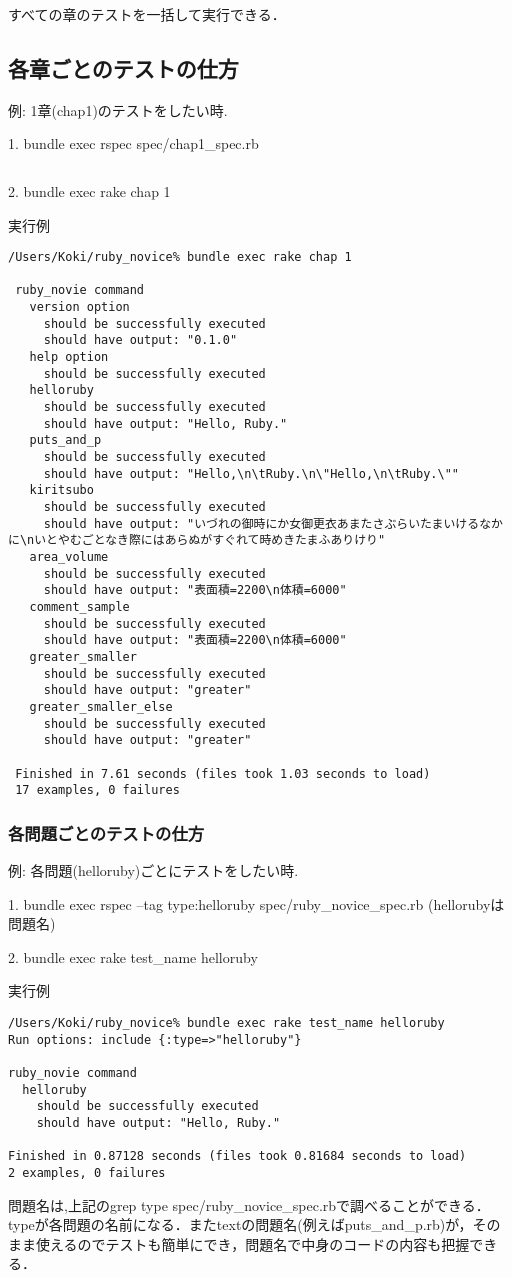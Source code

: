 すべての章のテストを一括して実行できる．

\subsection{各章ごとのテストの仕方}
例: 1章(chap1)のテストをしたい時.

1. bundle exec rspec spec/chap1\_spec.rb
\begin{quote}\begin{verbatim}

\end{verbatim}\end{quote}
2. bundle exec rake chap 1

実行例
\begin{lstlisting}[style=customRuby,basicstyle={\scriptsize\ttfamily}]
 /Users/Koki/ruby_novice% bundle exec rake chap 1   
 
 ruby_novie command
   version option
     should be successfully executed
     should have output: "0.1.0"
   help option
     should be successfully executed
   helloruby
     should be successfully executed
     should have output: "Hello, Ruby."
   puts_and_p
     should be successfully executed
     should have output: "Hello,\n\tRuby.\n\"Hello,\n\tRuby.\""
   kiritsubo
     should be successfully executed
     should have output: "いづれの御時にか女御更衣あまたさぶらいたまいけるなかに\nいとやむごとなき際にはあらぬがすぐれて時めきたまふありけり"
   area_volume
     should be successfully executed
     should have output: "表面積=2200\n体積=6000"
   comment_sample
     should be successfully executed
     should have output: "表面積=2200\n体積=6000"
   greater_smaller
     should be successfully executed
     should have output: "greater"
   greater_smaller_else
     should be successfully executed
     should have output: "greater"
		 
 Finished in 7.61 seconds (files took 1.03 seconds to load)
 17 examples, 0 failures
\end{lstlisting}
\subsubsection{各問題ごとのテストの仕方}
例: 各問題(helloruby)ごとにテストをしたい時.

1. bundle exec rspec --tag type:helloruby spec/ruby\_novice\_spec.rb  (hellorubyは問題名)

2. bundle exec rake test\_name helloruby

実行例
\begin{lstlisting}[style=customRuby,basicstyle={\scriptsize\ttfamily}]
/Users/Koki/ruby_novice% bundle exec rake test_name helloruby
Run options: include {:type=>"helloruby"}

ruby_novie command
  helloruby
    should be successfully executed
    should have output: "Hello, Ruby."
		 
Finished in 0.87128 seconds (files took 0.81684 seconds to load)
2 examples, 0 failures
\end{lstlisting}
問題名は,上記のgrep type spec/ruby\_novice\_spec.rbで調べることができる．
typeが各問題の名前になる．またtextの問題名(例えばputs\_and\_p.rb)が，そのまま使えるのでテストも簡単にでき，問題名で中身のコードの内容も把握できる．

